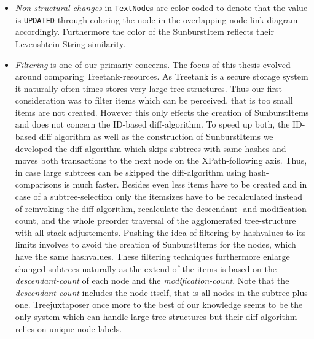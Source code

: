 \begin{itemize}
\item \emph{Non structural changes} in \texttt{TextNode}s are color coded to denote that the value is \texttt{UPDATED} through coloring the node in the overlapping node-link diagram accordingly. Furthermore the color of the SunburstItem reflects their Levenshtein String-similarity.
\item \emph{Filtering} is one of our primariy concerns. The focus of this thesis evolved around comparing Treetank-resources. As Treetank is a secure storage system it naturally often times stores very large tree-structures. Thus our first consideration was to filter items which can be perceived, that is too small items are not created. However this only effects the creation of SunburstItems and does not concern the ID-based diff-algorithm. To speed up both, the ID-based diff algorithm as well as the construction of SunburstItems we developed the diff-algorithm which skips subtrees with same hashes and moves both transactions to the next node on the XPath-following axis. Thus, in case large subtrees can be skipped the diff-algorithm using hash-comparisons is much faster. Besides even less items have to be created and in case of a subtree-selection only the itemsizes have to be recalculated instead of reinvoking the diff-algorithm, recalculate the descendant- and modification-count, and the whole preorder traversal of the agglomerated tree-structure with all stack-adjustements. Pushing the idea of filtering by hashvalues to its limits involves to avoid the creation of SunburstItems for the nodes, which have the same hashvalues. These filtering techniques furthermore enlarge changed subtrees naturally as the extend of the items is based on the \emph{descendant-count} of each node and the \emph{modification-count}. Note that the \emph{descendant-count} includes the node itself, that is all nodes in the subtree plus one. Treejuxtaposer once more to the best of our knowledge seems to be the only system which can handle large tree-structures but their diff-algorithm relies on unique node labels.
\end{itemize}

